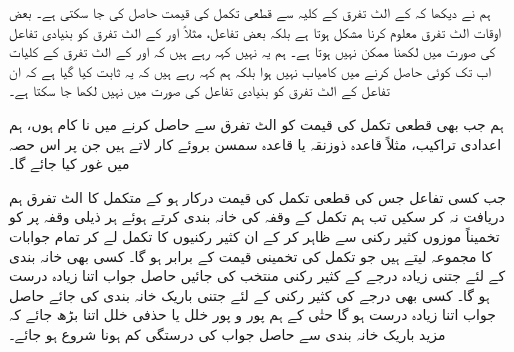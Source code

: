 ہم نے دیکھا کہ   کے الٹ تفرق  کے کلیہ سے قطعی تکمل  کی قیمت   حاصل کی جا سکتی ہے۔ بعض اوقات الٹ تفرق معلوم کرنا مشکل ہوتا ہے بلکہ بعض تفاعل، مثلاً  اور  کے الٹ تفرق کو بنیادی تفاعل کی صورت میں لکھنا ممکن نہیں ہوتا ہے۔ ہم یہ نہیں کہہ رہے ہیں کہ  اور   کے الٹ تفرق کے کلیات اب تک کوئی حاصل کرنے میں کامیاب نہیں ہوا بلکہ ہم کہہ رہے ہیں کہ یہ ثابت کیا گیا ہے کہ ان تفاعل کے الٹ تفرق کو بنیادی تفاعل کی صورت میں نہیں لکھا جا سکتا ہے۔ 

ہم جب بھی قطعی تکمل کی قیمت کو الٹ تفرق سے حاصل کرنے میں نا کام ہوں، ہم اعدادی تراکیب، مثلاً  قاعدہ ذوزنقہ یا قاعدہ سمسن  بروئے کار لاتے ہیں جن پر اس حصہ میں غور کیا جائے گا۔

جب کسی تفاعل جس کی قطعی تکمل کی قیمت درکار ہو کے متکمل  کا الٹ تفرق ہم دریافت نہ کر سکیں تب ہم تکمل کے وقفہ کی خانہ بندی کرتے ہوئے ہر ذیلی وقفہ پر  کو تخمیناً موزوں کثیر رکنی سے ظاہر کر کے ان کثیر رکنیوں کا تکمل لے کر تمام جوابات کا مجموعہ لیتے ہیں جو تکمل کی تخمینی قیمت کے برابر ہو گا۔ کسی بھی خانہ بندی کے لئے جتنی زیادہ درجے کے کثیر رکنی منتخب کی جائیں حاصل جواب اتنا زیادہ درست ہو گا۔ کسی بھی درجے کی کثیر رکنی کے لئے جتنی باریک خانہ بندی کی جائے حاصل جواب اتنا زیادہ درست ہو گا حتٰی کے ہم پور و پور خلل یا حذفی خلل اتنا بڑھ جائے کہ مزید باریک خانہ بندی سے حاصل جواب کی درستگی کم ہونا شروع ہو جائے۔

